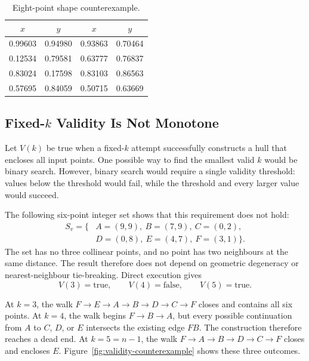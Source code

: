 \documentclass[a4paper,twoside]{article}
\begin{document}
\begin{table}[h]
  \centering
  \caption{Eight-point shape counterexample.}
  \label{tab:ce-points}
  \begin{tabular}{cc@{\qquad}cc}
    \toprule
    \(x\) & \(y\) & \(x\) & \(y\) \\
    \midrule
    0.99603 & 0.94980 & 0.93863 & 0.70464 \\
    0.12534 & 0.79581 & 0.63777 & 0.76837 \\
    0.83024 & 0.17598 & 0.83103 & 0.86563 \\
    0.57695 & 0.84059 & 0.50715 & 0.63669 \\
    \bottomrule
  \end{tabular}
\end{table}



\subsection{Fixed-\(k\) Validity Is Not Monotone}

Let \(V(k)\) be true when a fixed-\(k\) attempt successfully constructs a hull that encloses all input points. One possible way to find the smallest valid \(k\) would be binary search. However, binary search would require a single validity threshold: values below the threshold would fail, while the threshold and every larger value would succeed.

The following six-point integer set shows that this requirement does not hold:
\[
\begin{split}
S_v=\{&A=(9,9),\ B=(7,9),\ C=(0,2),\\
      &D=(0,8),\ E=(4,7),\ F=(3,1)\}.
\end{split}
\]
The set has no three collinear points, and no point has two neighbours at the same distance. The result therefore does not depend on geometric degeneracy or nearest-neighbour tie-breaking. Direct execution gives
\[
V(3)=\mathrm{true},\qquad
V(4)=\mathrm{false},\qquad
V(5)=\mathrm{true}.
\]

At \(k=3\), the walk
\(F\to E\to A\to B\to D\to C\to F\)
closes and contains all six points. At \(k=4\), the walk begins
\(F\to B\to A\), but every possible continuation from \(A\) to \(C\), \(D\), or \(E\) intersects the existing edge \(FB\). The construction therefore reaches a dead end. At \(k=5=n-1\), the walk
\(F\to A\to B\to D\to C\to F\)
closes and encloses \(E\). Figure~\ref{fig:validity-counterexample} shows these three outcomes.
\end{document}
